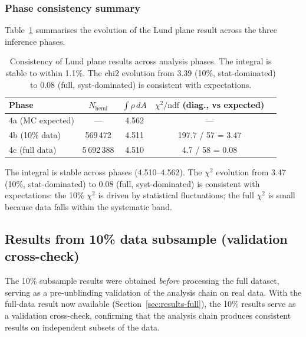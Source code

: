 \documentclass[11pt,a4paper]{article}
\begin{document}
\subsubsection{Phase consistency summary}
\label{sec:phase-consistency}

Table~\ref{tbl:phase-consistency} summarises the evolution of the Lund
plane result across the three inference phases.

\begin{table}[htbp]
\centering
\caption{Consistency of Lund plane results across analysis phases.
  The integral is stable to within 1.1\%.  The chi2 evolution from
  $3.39$ (10\%, stat-dominated) to $0.08$ (full, syst-dominated) is
  consistent with expectations.}
\label{tbl:phase-consistency}
\begin{tabular}{lcccc}
\toprule
Phase & $N_\text{hemi}$ & $\int \rho\,dA$ & $\chi^2/\text{ndf}$ (diag., vs expected) \\
\midrule
4a (MC expected) & --- & 4.562 & --- \\
4b (10\% data) & 569\,472 & 4.511 & 197.7 / 57 = 3.47 \\
4c (full data) & 5\,692\,388 & 4.510 & 4.7 / 58 = 0.08 \\
\bottomrule
\end{tabular}
\end{table}

The integral is stable across phases (4.510--4.562).  The $\chi^2$
evolution from 3.47 (10\%, stat-dominated) to 0.08 (full,
syst-dominated) is consistent with expectations: the 10\% $\chi^2$ is
driven by statistical fluctuations; the full $\chi^2$ is small because
data falls within the systematic band.

\subsection{Results from 10\% data subsample (validation cross-check)}
\label{sec:results-10pct}

The 10\% subsample results were obtained \emph{before} processing the
full dataset, serving as a pre-unblinding validation of the analysis
chain on real data.  With the full-data result now available
(Section~\ref{sec:results-full}), the 10\% results serve as a
validation cross-check, confirming that the analysis chain produces
consistent results on independent subsets of the data.
\end{document}
